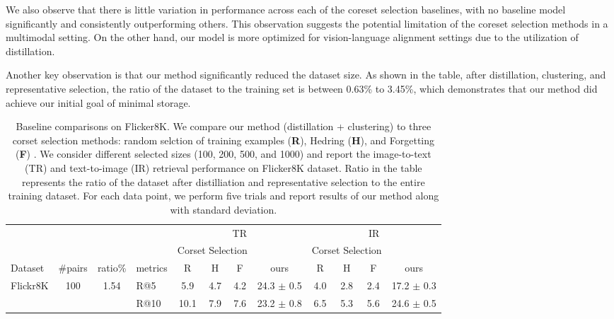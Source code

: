\documentclass[sigconf, nonacm]{acmart}
\begin{document}
We also observe that there is little variation in performance across each of the coreset selection baselines, with no baseline model significantly and consistently outperforming others. This observation suggests the potential limitation of the coreset selection methods in a multimodal setting. On the other hand, our model is more optimized for vision-language alignment settings due to the utilization of distillation.

Another key observation is that our method significantly reduced the dataset size. As shown in the table, after distillation, clustering, and representative selection, the ratio of the dataset to the training set is between 0.63\% to 3.45\%, which demonstrates that our method did achieve our initial goal of minimal storage.

\begin{table*}[!h]%
  \caption{Baseline comparisons on Flicker8K. \textnormal{We compare our method (distillation + clustering) to three corset selection methods: random selction of training examples (\textbf{R}), Hedring (\textbf{H}), and Forgetting (\textbf{F}) \cite{toneva2018empirical}. We consider different selected sizes (100, 200, 500, and 1000) and report the image-to-text (TR) and text-to-image (IR) retrieval performance on Flicker8K dataset. 
Ratio in the table represents the ratio of the dataset after distilliation and representative selection to the entire training dataset. 
For each data point, we perform five trials and report results of our method along with standard deviation.} }
  \label{tab:freq}
  \begin{tabular}{lccl|ccc|c|ccc|c}
    \toprule
     & & & & \multicolumn{4}{|c|}{TR}  & \multicolumn{4}{c}{IR}  \\ \cmidrule{5-8}\cmidrule{9-12}
     & & & & \multicolumn{3}{|c|}{Corset Selection} & &\multicolumn{3}{|c|}{Corset Selection} \\ \cmidrule{5-7} \cmidrule{8-11}
    Dataset & \#pairs & ratio\% & metrics & R & H & F & ours & R & H & F & ours \\ 
    \midrule
    \multirow{8}{*}{Flickr8K} & \multirow{2}{*}{100} & \multirow{2}{*}{1.54} & R@5 & 5.9 & 4.7 & 4.2 & 24.3 $\pm$ 0.5 & 4.0 & 2.8 & 2.4 & 17.2 $\pm$ 0.3 \\
                              & & & R@10 & 10.1 & 7.9 & 7.6  & 23.2 $\pm$ 0.8 & 6.5 & 5.3 & 5.6 & 24.6 $\pm$ 0.5 \\

\end{tabular}
\end{table*}
\end{document}
